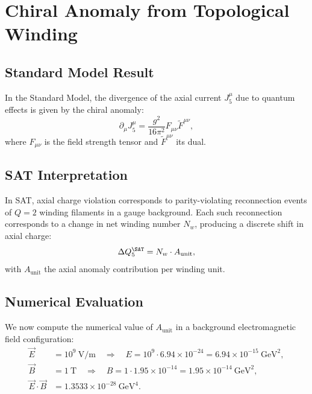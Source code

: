 

\section{Chiral Anomaly from Topological Winding}
\label{sec:chiral_anomaly}

\subsection{Standard Model Result}

In the Standard Model, the divergence of the axial current $J^\mu_5$
due to quantum effects is given by the chiral anomaly:
\begin{equation}
  \partial_\mu J^\mu_5 = \frac{g^2}{16\pi^2} F_{\mu\nu} \tilde{F}^{\mu\nu},
\end{equation}
where $F_{\mu\nu}$ is the field strength tensor and
$\tilde{F}^{\mu\nu}$ its dual.

\subsection{SAT Interpretation}

In SAT, axial charge violation corresponds to parity-violating reconnection
events of $Q=2$ winding filaments in a gauge background. Each such
reconnection corresponds to a change in net winding number $N_w$, producing
a discrete shift in axial charge:
\begin{equation}
  \Delta Q_5^{\SAT} = N_w \cdot A_{\text{unit}},
\end{equation}
with $A_{\text{unit}}$ the axial anomaly contribution per winding unit.

\subsection{Numerical Evaluation}

We now compute the numerical value of $A_{\text{unit}}$ in a background
electromagnetic field configuration:
\begin{align*}
  \vec{E} &= 10^9~\text{V/m} \quad \Rightarrow \quad
    E = 10^9 \cdot 6.94\times 10^{-24} = 6.94 \times 10^{-15}~\text{GeV}^2, \\
  \vec{B} &= 1~\text{T} \quad \Rightarrow \quad
    B = 1 \cdot 1.95\times 10^{-14} = 1.95 \times 10^{-14}~\text{GeV}^2, \\
  \vec{E} \cdot \vec{B} &= 1.3533 \times 10^{-28}~\text{GeV}^4.
\end{align*}

